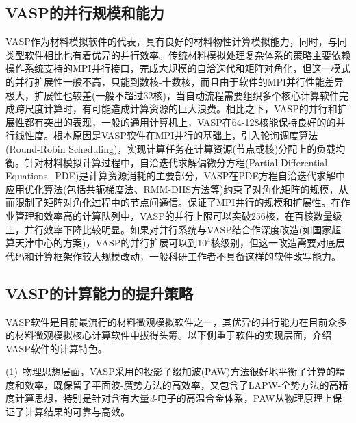 \subsection{\rm{VASP}的并行规模和能力}
\textrm{VASP}作为材料模拟软件的代表，具有良好的材料物性计算模拟能力，同时，与同类型软件相比也有着优异的并行效率。传统材料模拟处理复杂体系的策略主要依赖操作系统支持的\textrm{MPI}并行接口，完成大规模的自洽迭代和矩阵对角化，但这一模式的并行扩展性一般不高，只能到数核-十数核，而且由于软件的\textrm{MPI}并行性能差异极大，扩展性也较差(一般不超过32核)，当自动流程需要组织多个核心计算软件完成跨尺度计算时，有可能造成计算资源的巨大浪费。相比之下，\textrm{VASP}的并行和扩展性都有突出的表现，一般的通用计算机上，\textrm{VASP}在64-128核能保持良好的的并行线性度。根本原因是\textrm{VASP}软件在\textrm{MPI}并行的基础上，引入轮询调度算法\textrm{(Round-Robin Scheduling)}，实现计算任务在计算资源(节点或核)分配上的负载均衡。针对材料模拟计算过程中，自洽迭代求解偏微分方程\textrm{(Partial Differential Equations,~PDE)}是计算资源消耗的主要部分，\textrm{VASP}在\textrm{PDE}方程自洽迭代求解中应用优化算法(包括共轭梯度法、\textrm{RMM-DIIS}方法等)约束了对角化矩阵的规模，从而限制了矩阵对角化过程中的节点间通信。保证了\textrm{MPI}并行的规模和扩展性。在作业管理和效率高的计算队列中，\textrm{VASP}的并行上限可以突破256核，在百核数量级上，并行效率下降比较明显。如果对并行系统与\textrm{VASP}结合作深度改造(如国家超算天津中心的方案)，\textrm{VASP}的并行扩展可以到$10^4$核级别，但这一改造需要对底层代码和计算框架作较大规模改动，一般科研工作者不具备这样的软件改写能力。

\subsection{\rm{VASP}的计算能力的提升策略}
\textrm{VASP}软件是目前最流行的材料微观模拟软件之一，其优异的并行能力在目前众多的材料微观模拟核心计算软件中拔得头筹。以下侧重于软件的实现层面，介绍\textrm{VASP}软件的计算特色。

(1)~物理思想层面，\textrm{VASP}采用的投影子缀加波\textrm{(PAW)}方法很好地平衡了计算的精度和效率，既保留了平面波-赝势方法的高效率，又包含了\textrm{LAPW}-全势方法的高精度计算思想，特别是针对含有大量\textit{d}-电子的高温合金体系，\textrm{PAW}从物理原理上保证了计算结果的可靠与高效。

